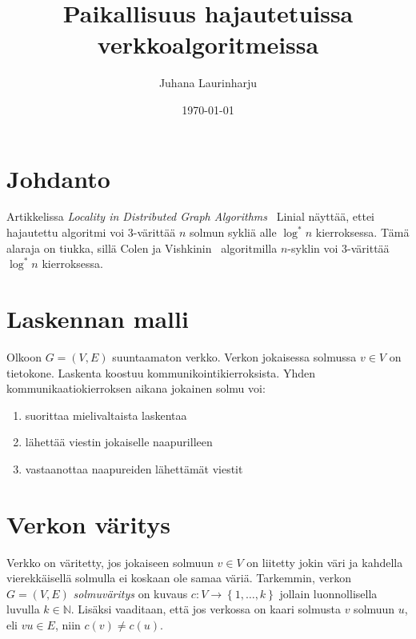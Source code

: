 \documentclass[finnish]{tktltiki2}
\title{Paikallisuus hajautetuissa verkkoalgoritmeissa}
\author{Juhana Laurinharju}
\date{\today}
\theoremstyle{definition}
\theoremstyle{remark}
\newcommand{\set}[1]{\left\{ #1 \right\}}
\newcommand{\nat}{\mathbb{N}}
\begin{document}

\maketitle        %
\makeabstract     %

\tableofcontents  %
\newpage          %



\section{Johdanto}

Artikkelissa \emph{Locality in Distributed Graph Algorithms}~\cite{linial92}
Linial näyttää, ettei hajautettu algoritmi voi 3-värittää $n$ solmun sykliä
alle ${\log^* n}$ kierroksessa. Tämä alaraja on tiukka, sillä Colen ja
Vishkinin~\cite{colevishkin86} algoritmilla $n$-syklin voi 3-värittää ${\log^*
n}$ kierroksessa.

\section{Laskennan malli}

Olkoon $G = (V,E)$ suuntaamaton verkko. Verkon jokaisessa solmussa $v \in V$ on
tietokone. Laskenta koostuu kommunikointikierroksista. Yhden
kommunikaatiokierroksen aikana jokainen solmu voi:

\begin{enumerate}
    \item suorittaa mielivaltaista laskentaa
    \item lähettää viestin jokaiselle naapurilleen
    \item vastaanottaa naapureiden lähettämät viestit
\end{enumerate}

\section{Verkon väritys}

Verkko on väritetty, jos jokaiseen solmuun $v \in V$ on liitetty jokin väri ja
kahdella vierekkäisellä solmulla ei koskaan ole samaa väriä. Tarkemmin, verkon
$G = (V,E)$ \emph{solmuväritys} on kuvaus $c : V \rightarrow \set{1,\dots,k}$
jollain luonnollisella luvulla $k \in \nat$. Lisäksi vaaditaan, että jos
verkossa on kaari solmusta $v$ solmuun $u$, eli $vu \in E$, niin $c(v) \neq
c(u)$.
\end{document}
